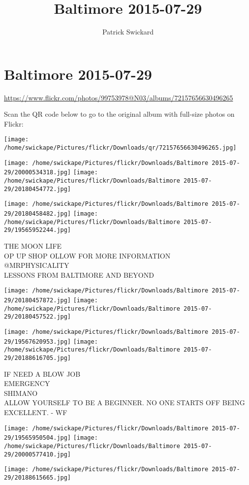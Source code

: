 \documentclass[10pt,letterpaper]{article}
\title{Baltimore 2015-07-29}
\author{Patrick Swickard}
\date{}
\begin{document}
\section*{Baltimore 2015-07-29}

\url{https://www.flickr.com/photos/99753978@N03/albums/72157656630496265}

Scan the QR code below to go to the original album with full-size photos on Flickr:

\texttt{[image: /home/swickape/Pictures/flickr/Downloads/qr/72157656630496265.jpg]}
\pagebreak

\texttt{[image: /home/swickape/Pictures/flickr/Downloads/Baltimore 2015-07-29/20000534318.jpg]}
\texttt{[image: /home/swickape/Pictures/flickr/Downloads/Baltimore 2015-07-29/20180454772.jpg]}

\texttt{[image: /home/swickape/Pictures/flickr/Downloads/Baltimore 2015-07-29/20180458482.jpg]}
\texttt{[image: /home/swickape/Pictures/flickr/Downloads/Baltimore 2015-07-29/19565952244.jpg]}

THE MOON LIFE\\
OP UP SHOP OLLOW FOR MORE INFORMATION\\
@MRPHYSICALITY\\
LESSONS FROM BALTIMORE AND BEYOND
\pagebreak

\texttt{[image: /home/swickape/Pictures/flickr/Downloads/Baltimore 2015-07-29/20180457872.jpg]}
\texttt{[image: /home/swickape/Pictures/flickr/Downloads/Baltimore 2015-07-29/20180457522.jpg]}

\texttt{[image: /home/swickape/Pictures/flickr/Downloads/Baltimore 2015-07-29/19567620953.jpg]}
\texttt{[image: /home/swickape/Pictures/flickr/Downloads/Baltimore 2015-07-29/20188616705.jpg]}

IF NEED A BLOW JOB\\
EMERGENCY\\
SHIMANO\\
ALLOW YOURSELF TO BE A BEGINNER.  NO ONE STARTS OFF BEING EXCELLENT.  {-} WF
\pagebreak

\texttt{[image: /home/swickape/Pictures/flickr/Downloads/Baltimore 2015-07-29/19565950504.jpg]}
\texttt{[image: /home/swickape/Pictures/flickr/Downloads/Baltimore 2015-07-29/20000577410.jpg]}

\vspace{0.25in}
\texttt{[image: /home/swickape/Pictures/flickr/Downloads/Baltimore 2015-07-29/20188615665.jpg]}
\end{document}
